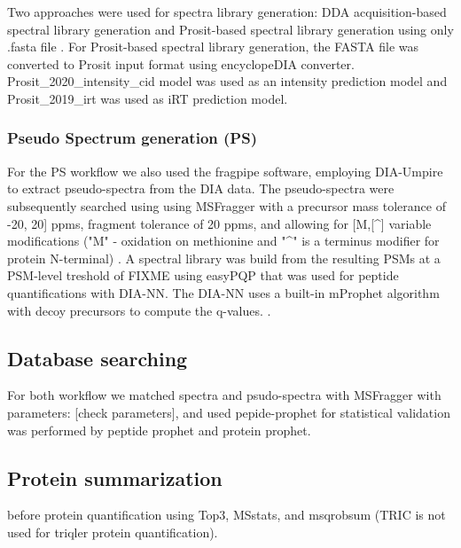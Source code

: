 \documentclass[10pt,letterpaper]{article}
\begin{document}
Two approaches were used for spectra library generation: DDA acquisition-based spectral library generation and Prosit-based spectral library generation using only .fasta file \cite{searle2020generating}. 
For Prosit-based spectral library generation, the FASTA file was converted to Prosit input format using encyclopeDIA converter. Prosit\_2020\_intensity\_cid model was used as an intensity prediction model and Prosit\_2019\_irt was used as iRT prediction model.  


\subsubsection*{Pseudo Spectrum generation (PS)}

 For the PS workflow we also used the fragpipe software, employing DIA-Umpire to extract pseudo-spectra from the DIA data. The pseudo-spectra were subsequently searched using using MSFragger with a precursor mass tolerance of -20, 20] ppms, fragment tolerance of 20 ppms, and allowing for [M,[\^{}] variable modifications ("M" - oxidation on methionine and "\^{}" is a terminus modifier for protein N-terminal) \todo{What is meant with "[M, [\^, nQnC, nE]"? ANSWER: The modifications in fragpipe}. A spectral library was build from the resulting PSMs at a PSM-level treshold of FIXME using easyPQP that was used for peptide quantifications with DIA-NN. The DIA-NN uses a built-in mProphet algorithm with decoy precursors to compute the q-values. \cite{reiter2011mprophet} \cite{demichev2020dia}.  


\subsection*{Database searching}
For both workflow we matched spectra and psudo-spectra with MSFragger with parameters: [check parameters], and used pepide-prophet for statistical validation was performed by peptide prophet and protein prophet.


\subsection*{Protein summarization}
 before protein quantification using Top3, MSstats, and msqrobsum (TRIC is not used for triqler protein quantification).  
\end{document}
